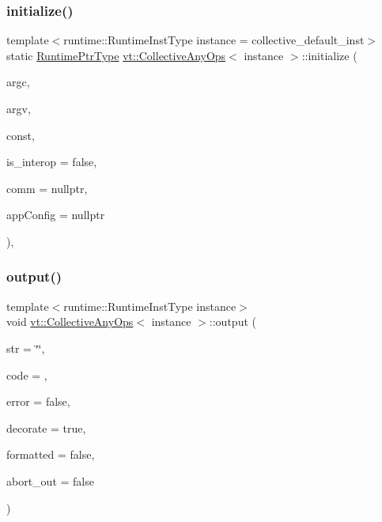 \subsubsection{\texorpdfstring{initialize()}{initialize()}\hspace{0.1cm}{\footnotesize\ttfamily [2/2]}}
{\footnotesize\ttfamily template$<$runtime\+::\+Runtime\+Inst\+Type instance = collective\+\_\+default\+\_\+inst$>$ \\
static \hyperlink{namespacevt_a0ce60e0299d8fa32223b3b9ffa0af466}{Runtime\+Ptr\+Type} \hyperlink{structvt_1_1_collective_any_ops}{vt\+::\+Collective\+Any\+Ops}$<$ instance $>$\+::initialize (\begin{DoxyParamCaption}\item[{int \&}]{argc,  }\item[{char $\ast$$\ast$\&}]{argv,  }\item[{\hyperlink{namespacevt_a2dc36fcada816dc6d11774d650328ee9}{Physical\+Resource\+Type}}]{const,  }\item[{bool}]{is\+\_\+interop = {\ttfamily false},  }\item[{M\+P\+I\+\_\+\+Comm $\ast$}]{comm = {\ttfamily nullptr},  }\item[{\hyperlink{structvt_1_1arguments_1_1_app_config}{arguments\+::\+App\+Config} const $\ast$}]{app\+Config = {\ttfamily nullptr} }\end{DoxyParamCaption})\hspace{0.3cm}{\ttfamily [inline]}, {\ttfamily [static]}}

\mbox{\label{structvt_1_1_collective_any_ops_a5ae4676659166ab1e1ac7334776d58c3}} 
\subsubsection{\texorpdfstring{output()}{output()}}
{\footnotesize\ttfamily template$<$runtime\+::\+Runtime\+Inst\+Type instance$>$ \\
void \hyperlink{structvt_1_1_collective_any_ops}{vt\+::\+Collective\+Any\+Ops}$<$ instance $>$\+::output (\begin{DoxyParamCaption}\item[{std\+::string const}]{str = {\ttfamily \char`\"{}\char`\"{}},  }\item[{\hyperlink{namespacevt_a793764d753923abc3d32929870beb485}{Error\+Code\+Type} const}]{code = {},  }\item[{bool}]{error = {\ttfamily false},  }\item[{bool}]{decorate = {\ttfamily true},  }\item[{bool}]{formatted = {\ttfamily false},  }\item[{bool}]{abort\+\_\+out = {\ttfamily false} }\end{DoxyParamCaption})\hspace{0.3cm}{\ttfamily [static]}}

